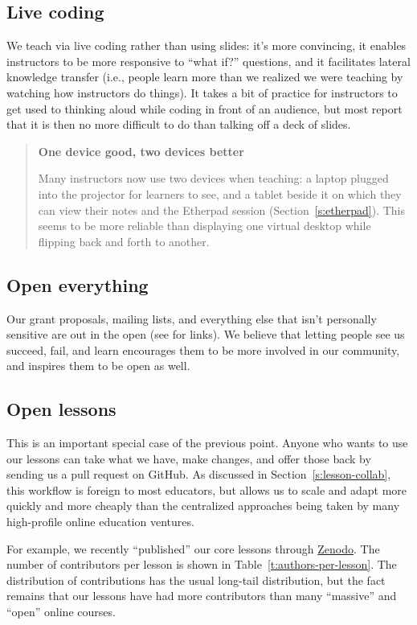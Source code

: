 \documentclass[10pt,a4paper,twocolumn]{article}
\begin{document}
\subsection{Live coding}

We teach via live coding rather than using slides: it's more
convincing, it enables instructors to be more responsive to ``what
if?'' questions, and it facilitates lateral knowledge transfer (i.e.,
people learn more than we realized we were teaching by watching how
instructors do things).  It takes a bit of practice for instructors to
get used to thinking aloud while coding in front of an audience, but
most report that it is then no more difficult to do than talking off a
deck of slides.

\begin{quote}
\textbf{One device good, two devices better}

Many instructors now use two devices when teaching: a laptop plugged
into the projector for learners to see, and a tablet beside it on
which they can view their notes and the Etherpad session
(Section~\ref{s:etherpad}).  This seems to be more reliable than
displaying one virtual desktop while flipping back and forth to
another.
\end{quote}

\subsection{Open everything}

Our grant proposals, mailing lists, and everything else that isn't
personally sensitive are out in the open (see \cite{swcsite} for
links).  We believe that letting people see us succeed, fail, and
learn encourages them to be more involved in our community, and
inspires them to be open as well.

\subsection{Open lessons}

This is an important special case of the previous point. Anyone who
wants to use our lessons can take what we have, make changes, and
offer those back by sending us a pull request on GitHub. As discussed
in Section~\ref{s:lesson-collab}, this workflow is foreign to most
educators, but allows us to scale and adapt more quickly and more
cheaply than the centralized approaches being taken by many
high-profile online education ventures.

For example, we recently ``published'' our core lessons through
\href{https://zenodo.org/}{Zenodo}.  The number of contributors per
lesson is shown in Table~\ref{t:authors-per-lesson}.  The distribution
of contributions has the usual long-tail distribution, but the fact
remains that our lessons have had more contributors than many
``massive'' and ``open'' online courses.
\end{document}
